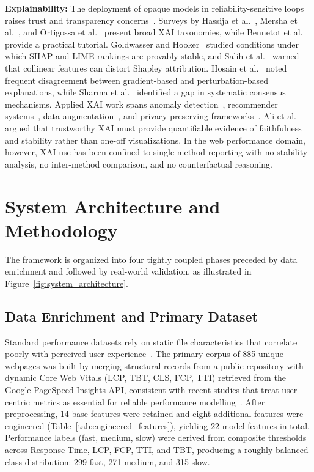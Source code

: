 \documentclass{svproc}
\begin{document}
\textbf{Explainability:} The deployment of opaque models in reliability-sensitive loops raises trust and transparency concerns~\cite{goyal2025,ali2023}. Surveys by Hassija et al.~\cite{hassija2024}, Mersha et al.~\cite{mersha2024}, and Ortigossa et al.~\cite{ortigossa2024} present broad XAI taxonomies, while Bennetot et al.~\cite{bennetot2024} provide a practical tutorial. Goldwasser and Hooker~\cite{goldwasser2024} studied conditions under which SHAP and LIME rankings are provably stable, and Salih et al.~\cite{salih2024} warned that collinear features can distort Shapley attribution. Hosain et al.~\cite{hosain2024} noted frequent disagreement between gradient-based and perturbation-based explanations, while Sharma et al.~\cite{zhou2024} identified a gap in systematic consensus mechanisms. Applied XAI work spans anomaly detection~\cite{alam2024}, recommender systems~\cite{benleulmi2025,rahim2025}, data augmentation~\cite{mersha2025}, and privacy-preserving frameworks~\cite{bhardwaj2025}. Ali et al.~\cite{ali2023} argued that trustworthy XAI must provide quantifiable evidence of faithfulness and stability rather than one-off visualizations. In the web performance domain, however, XAI use has been confined to single-method reporting with no stability analysis, no inter-method comparison, and no counterfactual reasoning.

\section{System Architecture and Methodology}

The framework is organized into four tightly coupled phases preceded by data enrichment and followed by real-world validation, as illustrated in Figure~\ref{fig:system_architecture}.

\subsection{Data Enrichment and Primary Dataset}

Standard performance datasets rely on static file characteristics that correlate poorly with perceived user experience~\cite{sehwag2024,huang2023}. The primary corpus of 885 unique webpages was built by merging structural records from a public repository with dynamic Core Web Vitals (LCP, TBT, CLS, FCP, TTI) retrieved from the Google PageSpeed Insights API, consistent with recent studies that treat user-centric metrics as essential for reliable performance modelling~\cite{mathur2024}. After preprocessing, 14 base features were retained and eight additional features were engineered (Table~\ref{tab:engineered_features}), yielding 22 model features in total. Performance labels (fast, medium, slow) were derived from composite thresholds across Response Time, LCP, FCP, TTI, and TBT, producing a roughly balanced class distribution: 299 fast, 271 medium, and 315 slow.
\end{document}
